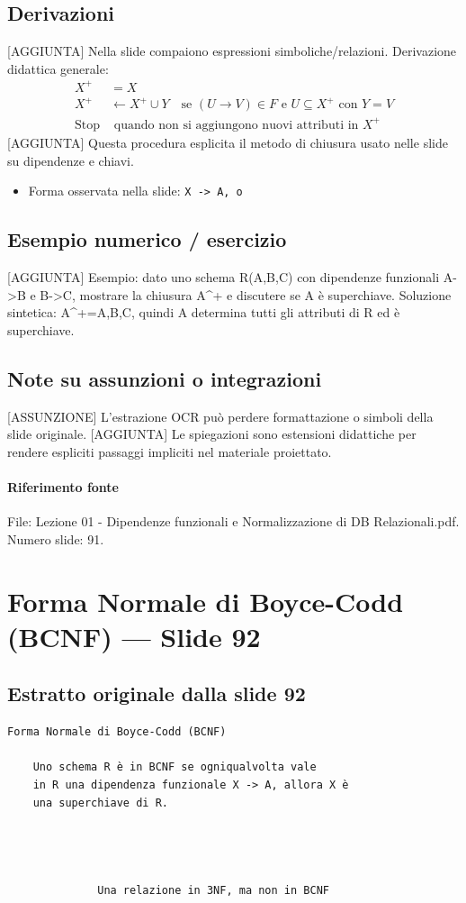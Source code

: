 \documentclass[11pt]{article}
\begin{document}
\subsection*{Derivazioni}
[AGGIUNTA] Nella slide compaiono espressioni simboliche/relazioni. Derivazione didattica generale:
\begin{align*}
X^+ &= X \\
X^+ &\leftarrow X^+ \cup Y \quad \text{se } (U \to V) \in F \text{ e } U \subseteq X^+ \text{ con } Y=V \\
\text{Stop} &\text{ quando non si aggiungono nuovi attributi in } X^+
\end{align*}
[AGGIUNTA] Questa procedura esplicita il metodo di chiusura usato nelle slide su dipendenze e chiavi.
\begin{itemize}[leftmargin=*]
\item Forma osservata nella slide: \texttt{X -> A, o}
\end{itemize}
\subsection*{Esempio numerico / esercizio}
[AGGIUNTA] Esempio: dato uno schema R(A,B,C) con dipendenze funzionali A->B e B->C, mostrare la chiusura A^+ e discutere se A è superchiave. Soluzione sintetica: A^+={A,B,C}, quindi A determina tutti gli attributi di R ed è superchiave.
\subsection*{Note su assunzioni o integrazioni}
[ASSUNZIONE] L'estrazione OCR può perdere formattazione o simboli della slide originale.
[AGGIUNTA] Le spiegazioni sono estensioni didattiche per rendere espliciti passaggi impliciti nel materiale proiettato.
\paragraph{Riferimento fonte} File: Lezione 01 - Dipendenze funzionali e Normalizzazione di DB Relazionali.pdf. Numero slide: 91.
\section{Forma Normale di Boyce-Codd (BCNF) --- Slide 92}
\subsection*{Estratto originale dalla slide 92}
\begin{lstlisting}
Forma Normale di Boyce-Codd (BCNF)

    Uno schema R è in BCNF se ogniqualvolta vale
    in R una dipendenza funzionale X -> A, allora X è
    una superchiave di R.




              Una relazione in 3NF, ma non in BCNF
\end{lstlisting}
\end{document}
